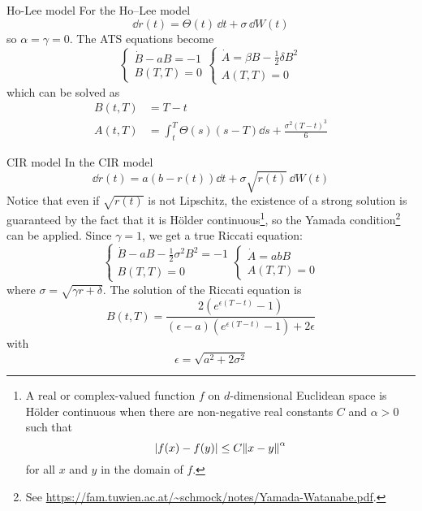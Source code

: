 \begin{example}{Ho-Lee model}{}{}
    For the Ho–Lee model
    \begin{equation*}
        \dd r(t) = \Theta(t)\,\dd t + \sigma\,\dd W(t)
    \end{equation*}
    so $\alpha = \gamma = 0$. The ATS equations become
    \begin{equation*}
    \begin{cases}
        \dot{B} - aB = -1 \\
        B(T,T) = 0
    \end{cases}
    \begin{cases}
    \dot{A} = \beta B - \frac{1}{2}\delta B^2 \\
    A(T,T) = 0
    \end{cases}
    \end{equation*}
    which can be solved as
    \begin{align*}
        B(t,T) &= T-t \\
        A(t,T) &= \int_t^T \Theta(s)(s-T)\dd s + \frac{\sigma^2(T-t)^3}{6}
    \end{align*}
\end{example} %
\begin{example}{CIR model}{}{}
    In the CIR model
    \begin{equation*}
        \dd r(t) = a(b-r(t))\dd t + \sigma\sqrt{r(t)}\,\dd W(t)
    \end{equation*}
    Notice that even if $\sqrt{r(t)}$ is not Lipschitz, the existence of a strong solution is guaranteed by the fact that it is Hölder continuous\footnote{A real or complex-valued function $f$ on $d$-dimensional Euclidean space is Hölder continuous when there are non-negative real constants $C$ and $\alpha>0$ such that $$\abs{f(x)-f(y)}\leq C \norm{x-y}^{\alpha}$$ for all $x$ and $y$ in the domain of $f$.}, so the Yamada condition\footnote{See \url{https://fam.tuwien.ac.at/~schmock/notes/Yamada-Watanabe.pdf}.} can be applied. Since $\gamma = 1$, we get a true Riccati equation:
    \begin{equation*}
    \begin{cases}
        \dot{B} - aB - \frac{1}{2}\sigma^2 B^2 = -1 \\
        B(T,T) = 0
    \end{cases}
    \begin{cases}
    \dot{A} = a b B\\
    A(T,T) = 0
    \end{cases}
    \end{equation*}
    where $\sigma = \sqrt{\gamma r + \delta}$. The solution of the Riccati equation is
    \begin{equation*}
        B(t,T) = \frac{2(e^{\epsilon(T-t)}-1)}{(\epsilon-a)(e^{\epsilon(T-t)}-1)+2\epsilon}
    \end{equation*}
    with
    \begin{equation*}
        \epsilon = \sqrt{a^2 + 2\sigma^2}
    \end{equation*}
\end{example}

